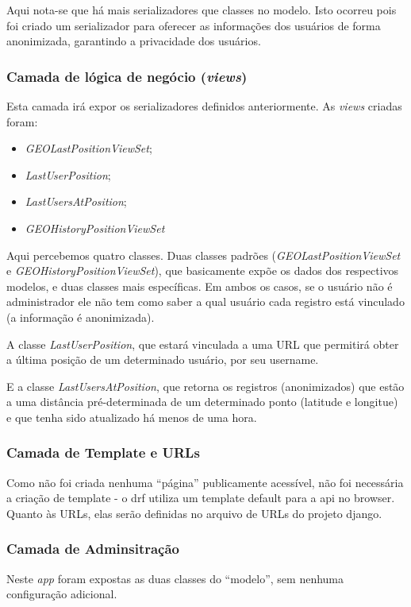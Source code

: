 Aqui nota-se que há mais serializadores que classes no modelo. Isto ocorreu pois foi criado um serializador para oferecer as informações dos usuários de forma anonimizada, garantindo a privacidade dos usuários.

\subsubsection{Camada de lógica de negócio (\textit{views})}
Esta camada irá expor os serializadores definidos anteriormente. As \textit{views} criadas foram: %
\begin{itemize}
    \item \textit{GEOLastPositionViewSet};
    \item \textit{LastUserPosition};
    \item \textit{LastUsersAtPosition};
    \item \textit{GEOHistoryPositionViewSet}
\end{itemize}
Aqui percebemos quatro classes. Duas classes padrões (\mbox{\textit{GEOLastPositionViewSet}} e \mbox{\textit{GEOHistoryPositionViewSet}}), que basicamente expõe os dados dos respectivos modelos, e duas classes mais específicas. Em ambos os casos, se o usuário não é administrador ele não tem como saber a qual usuário cada registro está vinculado (a informação é anonimizada).

A classe \textit{LastUserPosition}, que estará vinculada a uma URL que permitirá obter a última posição de um determinado usuário, por seu username. 

E a classe \textit{LastUsersAtPosition}, que retorna os registros (anonimizados) que estão a uma distância pré-determinada de um determinado ponto (latitude e longitue) e que tenha sido atualizado há menos de uma hora.

\subsubsection{Camada de Template e URLs}
Como não foi criada nenhuma ``página'' publicamente acessível, não foi necessária a criação de template - o \gls{drf} utiliza um template default para a \gls{api} no browser. Quanto às URLs, elas serão definidas no arquivo de URLs do projeto \gls{django}.

\subsubsection{Camada de Adminsitração}
Neste \textit{app} foram expostas as duas classes do ``modelo'', sem nenhuma configuração adicional.

